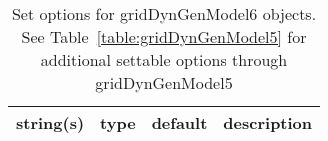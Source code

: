 \begin{table}[ht]
\centering
\begin{tabular}{p{5cm} c c p{7cm}}
\hline
string(s) & type & default & description \\
\hline
\hline
\end{tabular}
\caption{Set options for gridDynGenModel6 objects. See Table~\ref{table:gridDynGenModel5} for additional settable options through gridDynGenModel5}
\label{table:gridDynGenModel6}
\end{table}

